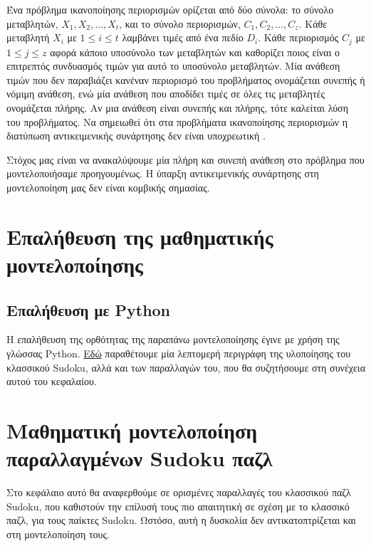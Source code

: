 \documentclass[oneside,12pt]{book}
\theoremstyle{definition}
\begin{document}
Ένα πρόβλημα ικανοποίησης περιορισμών ορίζεται από δύο σύνολα: το σύνολο μεταβλητών, \(X_1, X_2, \dots, X_t\), και το σύνολο περιορισμών, \(C_1, C_2, \dots, C_z\). Κάθε μεταβλητή \(X_i\) με \(1 \leq i \leq t\) λαμβάνει τιμές από ένα πεδίο \(D_i\). Κάθε περιορισμός \(C_j\) με \(1 \leq j \leq z\) αφορά κάποιο υποσύνολο των μεταβλητών και καθορίζει ποιος είναι ο επιτρεπτός συνδυασμός τιμών για αυτό το υποσύνολο μεταβλητών. Μία ανάθεση τιμών που δεν παραβιάζει κανέναν περιορισμό του προβλήματος ονομάζεται συνεπής ή νόμιμη ανάθεση, ενώ μία ανάθεση που αποδίδει τιμές σε όλες τις μεταβλητές ονομάζεται πλήρης. Αν μια ανάθεση είναι συνεπής και πλήρης, τότε καλείται λύση του προβλήματος. Να σημειωθεί ότι στα προβλήματα ικανοποίησης περιορισμών η διατύπωση αντικειμενικής συνάρτησης δεν είναι υποχρεωτική \cite{4}. \par

Στόχος μας είναι να ανακαλύψουμε μία πλήρη και συνεπή ανάθεση στο πρόβλημα που μοντελοποιήσαμε προηγουμένως. Η ύπαρξη αντικειμενικής συνάρτησης στη μοντελοποίηση μας δεν είναι κομβικής σημασίας.

\section{Επαλήθευση της μαθηματικής μοντελοποίησης}

\subsection{Επαλήθευση με Python}

Η επαλήθευση της ορθότητας της παραπάνω μοντελοποίησης έγινε με χρήση της γλώσσας Python.  \href{run:d:/path/presentation.pdf}{Εδώ} παραθέτουμε μία λεπτομερή περιγράφη της υλοποίησης του κλασσικού Sudoku, αλλά και των παραλλαγών του, που θα συζητήσουμε στη συνέχεια αυτού του κεφαλαίου. \par

\section{Μαθηματική μοντελοποίηση παραλλαγμένων Sudoku παζλ}

Στο κεφάλαιο αυτό θα αναφερθούμε σε ορισμένες παραλλαγές του κλασσικού παζλ Sudoku, που καθιστούν την επίλυσή τους πιο απαιτητική σε σχέση με το κλασσικό παζλ, για τους παίκτες Sudoku. Ωστόσο, αυτή η δυσκολία δεν αντικατοπτρίζεται και στη μοντελοποίηση τους. \par
\end{document}
